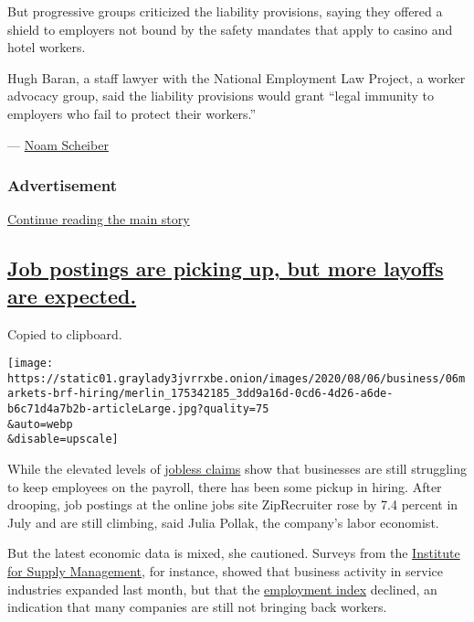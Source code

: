 But progressive groups criticized the liability provisions, saying they
offered a shield to employers not bound by the safety mandates that
apply to casino and hotel workers.

Hugh Baran, a staff lawyer with the National Employment Law Project, a
worker advocacy group, said the liability provisions would grant ``legal
immunity to employers who fail to protect their workers.''

--- \href{https://www.nytimes3xbfgragh.onion/by/noam-scheiber}{Noam
Scheiber}

\hypertarget{advertisement-2}{%
\subsubsection{Advertisement}\label{advertisement-2}}

\protect\hyperlink{after-dfp-ad-mid3}{Continue reading the main story}

\hypertarget{job-postings-are-picking-up-but-more-layoffs-are-expected}{%
\subsection{\texorpdfstring{\protect\hyperlink{job-postings-are-picking-up-but-more-layoffs-are-expected}{Job
postings are picking up, but more layoffs are
expected.}}{Job postings are picking up, but more layoffs are expected.}}\label{job-postings-are-picking-up-but-more-layoffs-are-expected}}

Copied to clipboard.

\texttt{[image: https://static01.graylady3jvrrxbe.onion/images/2020/08/06/business/06markets-brf-hiring/merlin\_175342185\_3dd9a16d-0cd6-4d26-a6de-b6c71d4a7b2b-articleLarge.jpg?quality=75\\\&auto=webp\\\&disable=upscale]}

While the elevated levels of
\href{https://www.nytimes3xbfgragh.onion/live/2020/08/06/business/stock-market-today-coronavirus\#new-state-jobless-claims-decline-but-exceed-one-million-for-the-20th-week}{jobless
claims} show that businesses are still struggling to keep employees on
the payroll, there has been some pickup in hiring. After drooping, job
postings at the online jobs site ZipRecruiter rose by 7.4 percent in
July and are still climbing, said Julia Pollak, the company's labor
economist.

But the latest economic data is mixed, she cautioned. Surveys from the
\href{https://www.ismworld.org/}{Institute for Supply Management}, for
instance, showed that business activity in service industries expanded
last month, but that the
\href{https://www.nytimes3xbfgragh.onion/live/2020/08/06/business/stock-market-today-coronavirus\#as-unemployment-benefits-began-to-run-out-a-freelance-job-came-just-in-time}{employment
index} declined, an indication that many companies are still not
bringing back workers.

